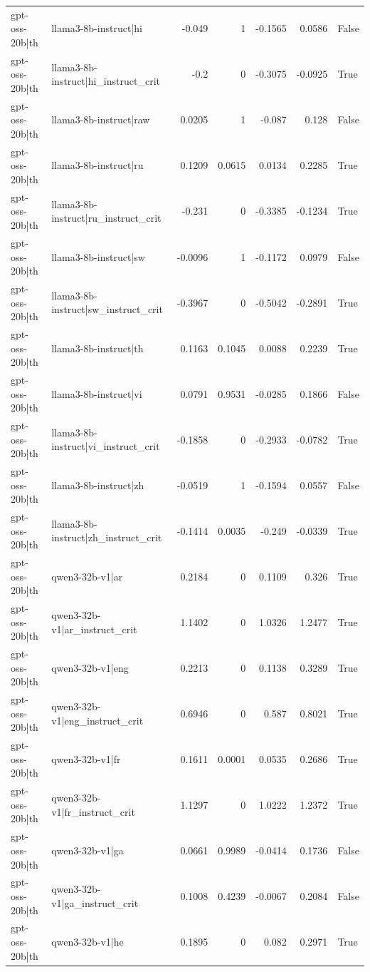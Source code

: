 \begin{table}
\begin{tabular}{l l r r r r l}
gpt-oss-20b|th & llama3-8b-instruct|hi & -0.049 & 1 & -0.1565 & 0.0586 & False \\
gpt-oss-20b|th & llama3-8b-instruct|hi_instruct_crit & -0.2 & 0 & -0.3075 & -0.0925 & True \\
gpt-oss-20b|th & llama3-8b-instruct|raw & 0.0205 & 1 & -0.087 & 0.128 & False \\
gpt-oss-20b|th & llama3-8b-instruct|ru & 0.1209 & 0.0615 & 0.0134 & 0.2285 & True \\
gpt-oss-20b|th & llama3-8b-instruct|ru_instruct_crit & -0.231 & 0 & -0.3385 & -0.1234 & True \\
gpt-oss-20b|th & llama3-8b-instruct|sw & -0.0096 & 1 & -0.1172 & 0.0979 & False \\
gpt-oss-20b|th & llama3-8b-instruct|sw_instruct_crit & -0.3967 & 0 & -0.5042 & -0.2891 & True \\
gpt-oss-20b|th & llama3-8b-instruct|th & 0.1163 & 0.1045 & 0.0088 & 0.2239 & True \\
gpt-oss-20b|th & llama3-8b-instruct|vi & 0.0791 & 0.9531 & -0.0285 & 0.1866 & False \\
gpt-oss-20b|th & llama3-8b-instruct|vi_instruct_crit & -0.1858 & 0 & -0.2933 & -0.0782 & True \\
gpt-oss-20b|th & llama3-8b-instruct|zh & -0.0519 & 1 & -0.1594 & 0.0557 & False \\
gpt-oss-20b|th & llama3-8b-instruct|zh_instruct_crit & -0.1414 & 0.0035 & -0.249 & -0.0339 & True \\
gpt-oss-20b|th & qwen3-32b-v1|ar & 0.2184 & 0 & 0.1109 & 0.326 & True \\
gpt-oss-20b|th & qwen3-32b-v1|ar_instruct_crit & 1.1402 & 0 & 1.0326 & 1.2477 & True \\
gpt-oss-20b|th & qwen3-32b-v1|eng & 0.2213 & 0 & 0.1138 & 0.3289 & True \\
gpt-oss-20b|th & qwen3-32b-v1|eng_instruct_crit & 0.6946 & 0 & 0.587 & 0.8021 & True \\
gpt-oss-20b|th & qwen3-32b-v1|fr & 0.1611 & 0.0001 & 0.0535 & 0.2686 & True \\
gpt-oss-20b|th & qwen3-32b-v1|fr_instruct_crit & 1.1297 & 0 & 1.0222 & 1.2372 & True \\
gpt-oss-20b|th & qwen3-32b-v1|ga & 0.0661 & 0.9989 & -0.0414 & 0.1736 & False \\
gpt-oss-20b|th & qwen3-32b-v1|ga_instruct_crit & 0.1008 & 0.4239 & -0.0067 & 0.2084 & False \\
gpt-oss-20b|th & qwen3-32b-v1|he & 0.1895 & 0 & 0.082 & 0.2971 & True \\

\end{tabular}
\end{table}
